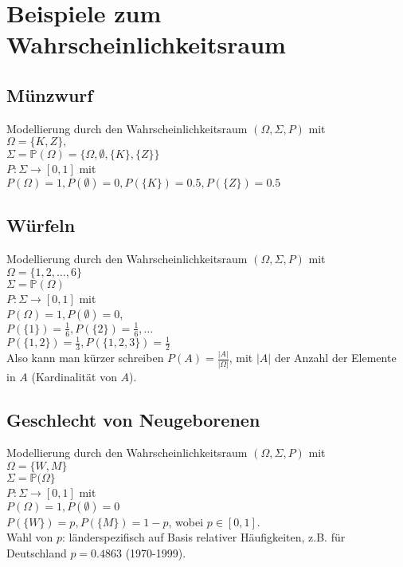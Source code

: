 \section{Beispiele zum Wahrscheinlichkeitsraum}
\subsection{Münzwurf}
Modellierung durch den Wahrscheinlichkeitsraum $(\Omega, \Sigma, P)$ mit\\
$\Omega = \{K,Z\},$\\
$\Sigma = \mathbb{P}(\Omega) = \{ \Omega, \emptyset, \{K\}, \{Z\}\}$\\
$P: \Sigma \to [0,1]$ mit\\
$P(\Omega) = 1, P(\emptyset) = 0, P(\{K\}) = 0.5, P(\{Z\}) = 0.5$

\subsection{Würfeln}
Modellierung durch den Wahrscheinlichkeitsraum $(\Omega, \Sigma, P)$ mit\\
$\Omega = \{1,2,\dots,6\}$\\
$\Sigma =\mathbb{P}(\Omega)$\\
$P: \Sigma \to [0,1]$ mit\\
$P(\Omega) = 1, P(\emptyset) = 0$,\\
$P(\{1\})=\frac{1}{6}, P(\{2\})=\frac{1}{6}, \dots$\\
$P(\{1, 2\})=\frac{1}{3}, P(\{1,2,3\})=\frac{1}{2}$\\
Also kann man kürzer schreiben $P(A) = \frac{|A|}{|\Omega|}$, mit $|A|$ der Anzahl der Elemente in $A$
(Kardinalität von $A$).

\subsection{Geschlecht von Neugeborenen}
Modellierung durch den Wahrscheinlichkeitsraum $(\Omega, \Sigma, P)$ mit\\
$\Omega = \{W,M\}$\\
$\Sigma = \mathbb{P}(\Omega\}$\\
$P: \Sigma \to [0,1]$ mit\\
$P(\Omega) = 1, P(\emptyset)=0$\\
$P(\{W\}) = p, P(\{M\}) = 1-p$, wobei $p \in [0,1]$.\\
Wahl von $p$: länderspezifisch auf Basis relativer Häufigkeiten, z.B. für Deutschland $p=0.4863$ (1970-1999).
